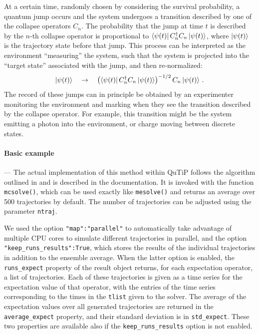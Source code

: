 \documentclass[preprint,3p,sort&compress]{elsarticle}
\def\code#1{\texttt{#1}}
\begin{document}
At a certain time, randomly chosen by considering the survival probability, a quantum jump occurs and the system undergoes a transition described by one of the collapse operators $C_n$. The probability that the jump at time $t$ is described by the $n$-th collapse operator is proportional to $\bra{\psi(t)} C_n^\dagger C_n \ket{\psi(t)}$, where $\ket{\psi(t)}$ is the trajectory state before that jump.  This process can be interpreted as the environment ``measuring'' the system, such that the system is projected into the ``target state'' associated with the jump, and then re-normalized:
\begin{equation}
    \ket{\psi(t)} \quad\to\quad \bigl( \bra{\psi(t)} C_n^\dagger C_n \ket{\psi(t)} \bigr)^{-1/2}\, C_n \ket{\psi(t)}\, .
\end{equation}
The record of these jumps can in principle be obtained by an experimenter monitoring the environment and marking when they see the transition described by the collapse operator. For example, this transition might be the system emitting a photon into the environment, or charge moving between discrete states.


\paragraph{Basic example} --- The actual implementation of this method within QuTiP follows the algorithm outlined in \cite{mc1,mc2,mc3} and is described in the documentation. It is invoked with the function \code{mcsolve()}, which can be used exactly like \code{mesolve()} and returns an average over 500 trajectories by default. The number of trajectories can be adjusted using the parameter \code{ntraj}.


We used the option \code{"map":"parallel"} to automatically take advantage of multiple CPU cores to simulate different trajectories in parallel, and the option \code{"keep\_runs\_results":True}, which stores the results of the individual trajectories in addition to the ensemble average.  When the latter option is enabled, the \code{runs\_expect} property of the result object returns, for each expectation operator, a list of trajectories. Each of these trajectories is given as a time series for the expectation value of that operator, with the entries of the time series corresponding to the times in the \code{tlist} given to the solver. The average of the expectation values over all generated trajectories are returned in the \code{average\_expect} property, and their standard deviation is in \code{std\_expect}. These two properties are available also if the \code{keep\_runs\_results} option is not enabled.
\end{document}

